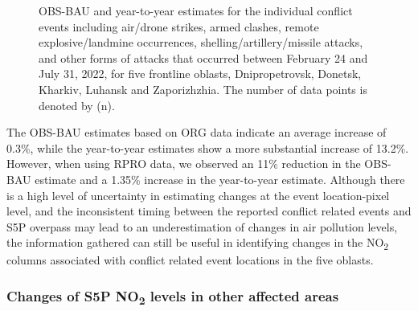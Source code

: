 \begin{figure}[tbh!]
\begin{subfigure}{.5\textwidth}
      \caption{}
      \label{fig:fig7b}
    \end{subfigure}
    \caption[NO\textsubscript{2} level changes estimates for conflict events]{OBS-BAU and year-to-year estimates for the individual conflict events including air/drone strikes, armed clashes, remote explosive/landmine occurrences, shelling/artillery/missile attacks, and other forms of attacks that occurred between February 24 and July 31, 2022, for five frontline oblasts, Dnipropetrovsk, Donetsk, Kharkiv, Luhansk and Zaporizhzhia. The number of data points is denoted by (n).}
    \label{fig:chap3_fig7}
\end{figure}
The OBS-BAU estimates based on ORG data indicate an average increase of 0.3\%, while the year-to-year estimates show a more substantial increase of 13.2\%. However, when using RPRO data, we observed an 11\% reduction in the OBS-BAU estimate and a 1.35\% increase in the year-to-year estimate. Although there is a high level of uncertainty in estimating changes at the event location-pixel level, and the inconsistent timing between the reported conflict related events and S5P overpass may lead to an underestimation of changes in air pollution levels, the information gathered can still be useful in identifying changes in the NO\textsubscript{2} columns associated with conflict related event locations in the five oblasts.\par
\subsubsection*{Changes of S5P NO\textsubscript{2} levels in other affected areas}
